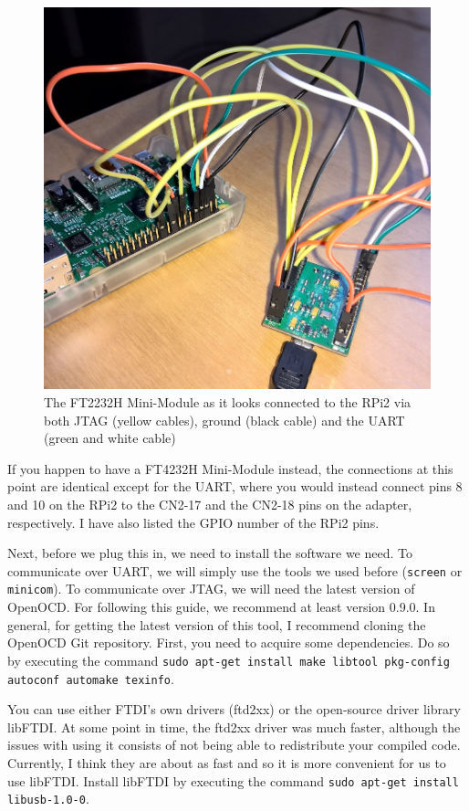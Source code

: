 \documentclass[a4paper,11pt,reqno]{amsart}
\begin{document}
{\begin{figure}[hb]
\begin{center}
   \includegraphics[scale=0.3]{connection2.png}
 \end{center}
 \caption{The FT2232H Mini-Module as it looks connected to the RPi2 via both JTAG (yellow cables), ground (black cable) and the UART (green and white cable)}
 \label{fig:conn2}
\end{figure}

If you happen to have a FT4232H Mini-Module instead, the connections at this point are identical except for the UART, where you would instead connect pins 8 and 10 on the RPi2 to the CN2-17 and the CN2-18 pins on the adapter, respectively. I have also listed the GPIO number of the RPi2 pins.

Next, before we plug this in, we need to install the software we need. To communicate over UART, we will simply use the tools we used before (\texttt{screen} or \texttt{minicom}). To communicate over JTAG, we will need the latest version of OpenOCD. For following this guide, we recommend at least version 0.9.0. In general, for getting the latest version of this tool, I recommend cloning the OpenOCD Git repository. First, you need to acquire some dependencies. Do so by executing the command \texttt{sudo apt-get install make libtool pkg-config autoconf automake texinfo}.

You can use either FTDI's own drivers (ftd2xx) or the open-source driver library libFTDI. At some point in time, the ftd2xx driver was much faster, although the issues with using it consists of not being able to redistribute your compiled code. Currently, I think they are about as fast and so it is more convenient for us to use libFTDI. Install libFTDI by executing the command \texttt{sudo apt-get install libusb-1.0-0}.

}
\end{document}
